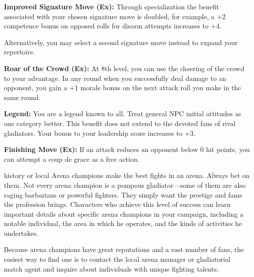 {\textbf{Improved Signature Move (Ex):} Through specialization the benefit associated with your chosen signature move is doubled, for example, a +2 competence bonus on opposed rolls for disarm attempts increases to +4.

Alternatively, you may select a second signature move instead to expand your repertoire.

\textbf{Roar of the Crowd (Ex):} At 8th level, you can use the cheering of the crowd to your advantage. In any round when you successfully deal damage to an opponent, you gain a +1 morale bonus on the next attack roll you make in the same round.

\textbf{Legend:} You are a legend known to all. Treat general NPC initial attitudes as one category better. This benefit does not extend to the devoted fans of rival gladiators. Your bonus to your leadership score increases to +3.

\textbf{Finishing Move (Ex):} If an attack reduces an opponent below 0 hit points, you can attempt a coup de grace as a free action.
}
{}
{history or local}
{Arena champions make the best fights in an arena. Always bet on them.}
{Not every arena champion is a pompous gladiator---some of them are also raging barbarians or powerful fighters. They simply want the prestige and fame the profession brings.}
{Characters who achieve this level of success can learn important details about specific arena champions in your campaign, including a notable individual, the area in which he operates, and the kinds of activities he undertakes.}

Because arena champions have great reputations and a vast number of fans, the easiest way to find one is to contact the local arena manager or gladiatorial match agent and inquire about individuals with unique fighting talents.